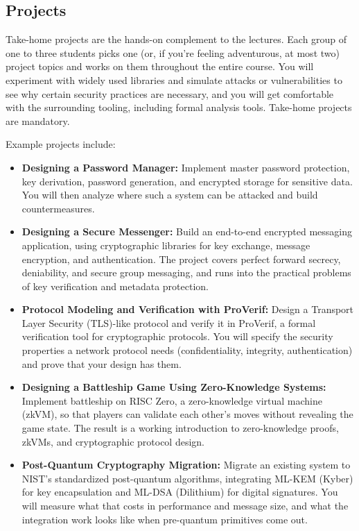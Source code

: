 \documentclass[10pt,a4paper,american]{exam}
\begin{document}
\subsection{Projects}
Take-home projects are the hands-on complement to the lectures. Each group of one to three students picks one (or, if you're feeling adventurous, at most two) project topics and works on them throughout the entire course. You will experiment with widely used libraries and simulate attacks or vulnerabilities to see why certain security practices are necessary, and you will get comfortable with the surrounding tooling, including formal analysis tools. Take-home projects are mandatory.

Example projects include:

\begin{itemize}
	\item \textbf{Designing a Password Manager:} Implement master password protection, key derivation, password generation, and encrypted storage for sensitive data. You will then analyze where such a system can be attacked and build countermeasures.
	\item \textbf{Designing a Secure Messenger:} Build an end-to-end encrypted messaging application, using cryptographic libraries for key exchange, message encryption, and authentication. The project covers perfect forward secrecy, deniability, and secure group messaging, and runs into the practical problems of key verification and metadata protection.
	\item \textbf{Protocol Modeling and Verification with ProVerif:} Design a Transport Layer Security (TLS)-like protocol and verify it in ProVerif, a formal verification tool for cryptographic protocols. You will specify the security properties a network protocol needs (confidentiality, integrity, authentication) and prove that your design has them.
	\item \textbf{Designing a Battleship Game Using Zero-Knowledge Systems:} Implement battleship on RISC Zero, a zero-knowledge virtual machine (zkVM), so that players can validate each other's moves without revealing the game state. The result is a working introduction to zero-knowledge proofs, zkVMs, and cryptographic protocol design.
	\item \textbf{Post-Quantum Cryptography Migration:} Migrate an existing system to NIST's standardized post-quantum algorithms, integrating ML-KEM (Kyber) for key encapsulation and ML-DSA (Dilithium) for digital signatures. You will measure what that costs in performance and message size, and what the integration work looks like when pre-quantum primitives come out.

\end{itemize}
\end{document}
